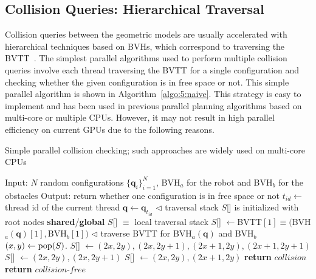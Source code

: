 \subsection{Collision Queries: Hierarchical Traversal}
Collision queries between the geometric models are usually accelerated with hierarchical techniques based on BVHs,
which correspond to traversing the BVTT~\cite{LGLM00}. The simplest parallel algorithms
used to perform multiple collision queries involve each thread traversing the BVTT for a single configuration and checking whether the given configuration is
in free space or not. This simple parallel algorithm is shown in Algorithm~\ref{algo:5:naive}. This
strategy is easy to implement and has been used in previous parallel planning algorithms based on multi-core or multiple CPUs.
However, it may not result in high parallel efficiency on current GPUs due to the following reasons.
\begin{algorithm}[htb]
    \caption{Simple parallel collision checking; such approaches are widely used on multi-core CPUs}
    \label{algo:5:naive}
    \begin{algorithmic}[1]
    \STATE Input: $N$ random configurations $\{\mathbf{q}_i\}_{i=1}^N$, BVH$_a$ for the robot and BVH$_b$ for the obstacles
    \STATE Output: return whether one configuration is in free space or not
    \STATE $t_{id} \leftarrow $ thread id of the current thread
    \STATE $\mathbf{q} \leftarrow \mathbf{q}_{t_{id}}$
    \STATE $\lhd$ traversal stack $S$[] is initialized with root nodes
    \STATE \textbf{shared}/\textbf{global} $S$[] $\equiv$ local traversal stack
    \STATE $S$[] $\leftarrow $BVTT$[1] \equiv ($BVH$_a(\mathbf{q})[1],$BVH$_b[1])$
    \STATE $\lhd$ traverse BVTT for BVH$_a(\mathbf{q})$ and BVH$_b$
    \LOOP
    \STATE $(x,y) \leftarrow \operatorname{pop}(S)$.
            \STATE $S$[] $\leftarrow (2x,2y),(2x,2y+1),(2x+1,2y),(2x+1,2y+1)$
        \ENDIF
            \STATE $S$[] $\leftarrow (2x,2y),(2x,2y+1)$
        \ENDIF
            \STATE $S$[] $\leftarrow (2x,2y),(2x+1,2y)$
        \ENDIF
            \STATE \textbf{return} $collision$
        \ENDIF
    \ENDIF
    \ENDLOOP
    \STATE \textbf{return} $collision\text{-}free$
    \end{algorithmic}
\end{algorithm}
